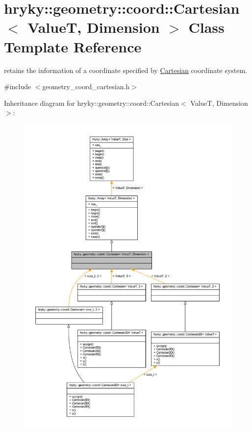 \hypertarget{classhryky_1_1geometry_1_1coord_1_1_cartesian}{\section{hryky\-:\-:geometry\-:\-:coord\-:\-:Cartesian$<$ Value\-T, Dimension $>$ Class Template Reference}
\label{classhryky_1_1geometry_1_1coord_1_1_cartesian}
}


retains the information of a coordinate specified by \hyperlink{classhryky_1_1geometry_1_1coord_1_1_cartesian}{Cartesian} coordinate system.  




{\ttfamily \#include $<$geometry\-\_\-coord\-\_\-cartesian.\-h$>$}



Inheritance diagram for hryky\-:\-:geometry\-:\-:coord\-:\-:Cartesian$<$ Value\-T, Dimension $>$\-:
\nopagebreak
\begin{figure}[H]
\begin{center}
\leavevmode
\includegraphics[width=350pt]{classhryky_1_1geometry_1_1coord_1_1_cartesian__inherit__graph}
\end{center}
\end{figure}
